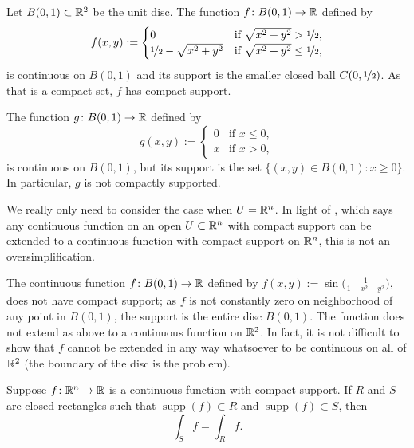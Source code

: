 \begin{example}
Let 
$B(0,1) \subset {\mathbb{R}}^2$ be the unit disc.  The function
$f \colon B(0,1) \to {\mathbb{R}}$ defined by
\begin{equation*}
f(x,y) :=
\begin{cases}
0                                & \text{if } \sqrt{x^2+y^2} > \nicefrac{1}{2}, \\
\nicefrac{1}{2} - \sqrt{x^2+y^2} & \text{if } \sqrt{x^2+y^2} \leq \nicefrac{1}{2},
\end{cases}
\end{equation*}
is continuous on $B(0,1)$ and its support is the smaller closed ball
$C(0,\nicefrac{1}{2})$.  As that is a compact set, $f$ has compact support.

The function $g \colon B(0,1) \to {\mathbb{R}}$ defined by
\begin{equation*}
g(x,y) :=
\begin{cases}
0 & \text{if } x \leq 0, \\
x & \text{if } x > 0,
\end{cases}
\end{equation*}
is continuous on $B(0,1)$, but its support is the set
$\bigl\{ (x,y) \in B(0,1) : x \geq 0 \bigr\}$.  In particular, $g$ is not compactly
supported.
\end{example}

We really only need to consider the case when $U={\mathbb{R}}^n$.  In light of
, which says any continuous
function on an open $U \subset {\mathbb{R}}^n$ with compact support can be extended to a
continuous function with compact support on ${\mathbb{R}}^n$,
this is not an oversimplification.

\begin{example}
The continuous function $f \colon B(0,1) \to {\mathbb{R}}$ defined by $f(x,y) :=
\sin\bigl(\frac{1}{1-x^2-y^2}\bigr)$, does not have compact support; as
$f$ is not constantly zero on neighborhood of any point in $B(0,1)$,
the support is the entire disc $B(0,1)$.  The function 
does not extend as above to a continuous function on ${\mathbb{R}}^2$.  In fact, it is not
difficult to show that $f$ cannot be extended in any way whatsoever to be
continuous on all of ${\mathbb{R}}^2$ (the boundary of the disc is the problem).
\end{example}

\begin{prop} \label{mv:prop:rectanglessupp}
Suppose $f \colon {\mathbb{R}}^n \to {\mathbb{R}}$ is a continuous function with compact support.
If $R$ and $S$ are closed rectangles such that
$\operatorname{supp}(f) \subset R$
and
$\operatorname{supp}(f) \subset S$, then
\begin{equation*}
\int_S f = \int_R f .
\end{equation*}
\end{prop}

